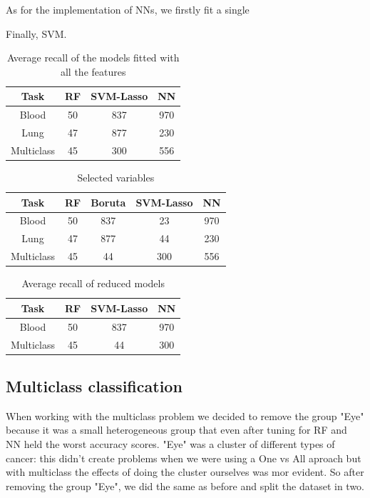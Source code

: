 \documentclass[a4paper,11pt, oneside]{article}  %
\begin{document}
As for the implementation of NNs,  we firstly fit a single 


Finally, SVM.






\begin{table}[ht]
	\caption{Average recall of the models fitted with all the features}
	\centering
	\begin{tabular}{c c c c}
		\hline\hline
		Task & RF & SVM-Lasso & NN \\ [0.5ex] %
		\hline
		Blood & 50 & 837 & 970 \\
		Lung &47 & 877 & 230 \\
		Multiclass & 45 & 300 & 556 \\ [1ex]
		\hline
	\end{tabular}
	\label{table:big_models}
\end{table}

\begin{table}[ht]
	\caption{Selected variables}
	\centering
	\begin{tabular}{c c c c c}
		\hline\hline
		Task & RF & Boruta & SVM-Lasso & NN \\ [0.5ex] %
		\hline
		Blood & 50 &837 & 23 & 970 \\
		Lung &47 & 877 & 44 & 230 \\
		Multiclass & 45 &  44 & 300 & 556 \\ [1ex]
		\hline
	\end{tabular}
	\label{table:selected variables}
\end{table}

\begin{table}[ht]
	\caption{Average recall of reduced models}
	\centering
	\begin{tabular}{c c c c}
		\hline\hline
		Task & RF & SVM-Lasso & NN \\ [0.5ex] %
		\hline
		Blood & 50 &837 & 970 \\
		Multiclass & 45 &  44 & 300 \\ [1ex]
		\hline
	\end{tabular}
	\label{table:reduced_models}
\end{table}





\subsection{Multiclass classification}
When working with the multiclass problem we decided to remove the group "Eye" because it was a small heterogeneous group that even after tuning for RF and NN held the worst accuracy scores. "Eye" was a cluster of different types of cancer: this didn't create problems when we were using a One vs All aproach but with multiclass the effects of doing the cluster ourselves was mor evident.  
So after removing the group "Eye", we did the same as before and split the dataset in two.
\end{document}
